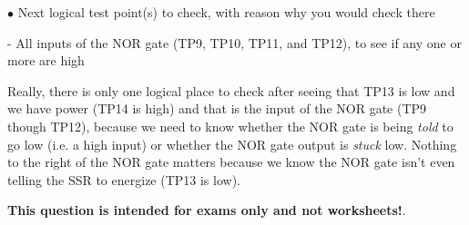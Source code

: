 \medskip
\goodbreak
\item{$\bullet$} Next logical test point(s) to check, with reason why you would check there
\item{-} All inputs of the NOR gate (TP9, TP10, TP11, and TP12), to see if any one or more are high
\medskip

Really, there is only one logical place to check after seeing that TP13 is low and we have power (TP14 is high) and that is the input of the NOR gate (TP9 though TP12), because we need to know whether the NOR gate is being {\it told} to go low (i.e. a high input) or whether the NOR gate output is {\it stuck} low.  Nothing to the right of the NOR gate matters because we know the NOR gate isn't even telling the SSR to energize (TP13 is low).







{\bf This question is intended for exams only and not worksheets!}.




